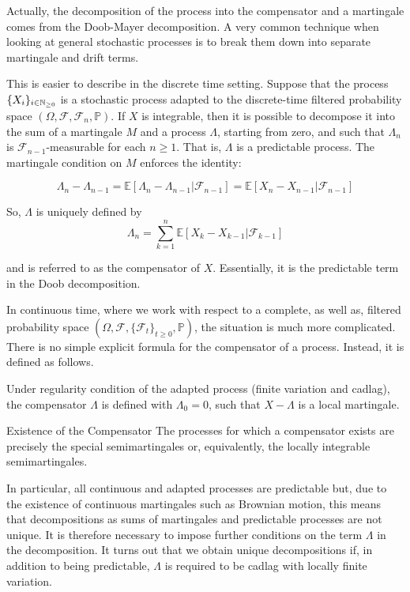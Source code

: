 Actually, the decomposition of the process into the compensator and a martingale comes from the Doob-Mayer decomposition. A very common technique when looking at general stochastic processes is to break them down into separate martingale and drift terms.

This is easier to describe in the discrete time setting. Suppose that the process $\{ X_i \}_{ i \in \mathbb{N}_{\geq 0}}$  is a stochastic process adapted to the discrete-time filtered probability space  $(\Omega, \mathcal F, \mathcal F_n, \mathbb P )$. If $X$ is integrable, then it is possible to decompose it into the sum of a martingale $M$ and a process $\Lambda$, starting from zero, and such that $\Lambda_n$ is $\mathcal{F}_{n-1}$-measurable for each $n\ge1$. That is, $\Lambda$ is a predictable process. The martingale condition on $M$ enforces the identity:

\begin{equation}
\Lambda_n-\Lambda_{n-1}={\mathbb E}[\Lambda_n-\Lambda_{n-1}\vert\mathcal{F}_{n-1}]={\mathbb E}[X_n-X_{n-1}\vert\mathcal{F}_{n-1}]
\end{equation}

So, $\Lambda$ is uniquely defined by
\begin{equation}
\Lambda_n=\sum_{k=1}^n{\mathbb E}\left[X_k-X_{k-1}\vert\mathcal{F}_{k-1}\right]
\end{equation}

and is referred to as the compensator of $X$. Essentially, it is the predictable term in the Doob decomposition.


In continuous time, where we work with respect to a complete, as well as, filtered probability space $(\Omega,\mathcal{F},\{\mathcal{F}_t\}_{t\ge0},{\mathbb P})$, the situation is much more complicated. There is no simple explicit formula for the compensator of a process. Instead, it is defined as follows.

Under regularity condition of the adapted process (finite variation and cadlag), the compensator $\Lambda $ is defined with $\Lambda_0=0$, such that $X-\Lambda$ is a local martingale. 


\begin{theoreme}{Existence of the Compensator}
The processes for which a compensator exists are precisely the special semimartingales or, equivalently, the locally integrable semimartingales. 
\end{theoreme}

In particular, all continuous and adapted processes are predictable but, due to the existence of continuous martingales such as Brownian motion, this means that decompositions as sums of martingales and predictable processes are not unique. It is therefore necessary to impose further conditions on the term $\Lambda$ in the decomposition. It turns out that we obtain unique decompositions if, in addition to being predictable, $\Lambda$ is required to be cadlag with locally finite variation. 


